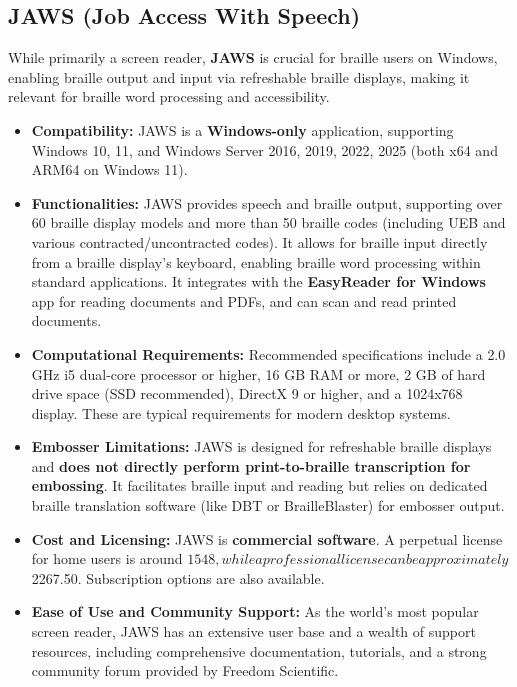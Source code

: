 \subsection{JAWS (Job Access With Speech)}
While primarily a screen reader, \textbf{JAWS} is crucial for braille users on Windows, enabling braille output and input via refreshable braille displays, making it relevant for braille word processing and accessibility.

\begin{itemize}
\item \textbf{Compatibility:} JAWS is a \textbf{Windows-only} application, supporting Windows 10, 11, and Windows Server 2016, 2019, 2022, 2025 (both x64 and ARM64 on Windows 11)\footnotemark[5].
\item \textbf{Functionalities:} JAWS provides speech and braille output, supporting over 60 braille display models and more than 50 braille codes (including UEB and various contracted/uncontracted codes). It allows for braille input directly from a braille display's keyboard, enabling braille word processing within standard applications. It integrates with the \textbf{EasyReader for Windows} app for reading documents and PDFs, and can scan and read printed documents\footnotemark[5].
\item \textbf{Computational Requirements:} Recommended specifications include a 2.0 GHz i5 dual-core processor or higher, 16 GB RAM or more, 2 GB of hard drive space (SSD recommended), DirectX 9 or higher, and a 1024x768 display\footnotemark[5]. These are typical requirements for modern desktop systems.
\item \textbf{Embosser Limitations:} JAWS is designed for refreshable braille displays and \textbf{does not directly perform print-to-braille transcription for embossing}. It facilitates braille input and reading but relies on dedicated braille translation software (like DBT or BrailleBlaster) for embosser output.
\item \textbf{Cost and Licensing:} JAWS is \textbf{commercial software}. A perpetual license for home users is around $1548, while a professional license can be approximately $2267.50. Subscription options are also available\footnotemark[6].
\item \textbf{Ease of Use and Community Support:} As the world's most popular screen reader, JAWS has an extensive user base and a wealth of support resources, including comprehensive documentation, tutorials, and a strong community forum provided by Freedom Scientific\footnotemark[5].
\end{itemize}

